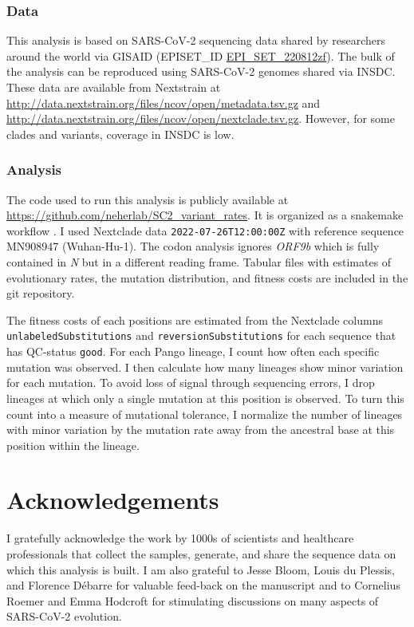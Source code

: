 \documentclass[aps,rmp, twocolumn]{revtex4}
\begin{document}
\subsubsection*{Data}
This analysis is based on SARS-CoV-2 sequencing data shared by researchers around the world via GISAID \citep{shu_gisaid_2017} (EPISET\_ID \href{10.55876/gis8.220812zf}{EPI_SET_220812zf}).
The bulk of the analysis can be reproduced using SARS-CoV-2 genomes shared via INSDC.
These data are available from Nextstrain at \url{http://data.nextstrain.org/files/ncov/open/metadata.tsv.gz} and \url{http://data.nextstrain.org/files/ncov/open/nextclade.tsv.gz}.
However, for some clades and variants, coverage in INSDC is low.

\subsubsection*{Analysis}
The code used to run this analysis is publicly available at \url{https://github.com/neherlab/SC2_variant_rates}.
It is organized as a snakemake workflow \citep{koster_snakemakescalable_2012}.
I used Nextclade data \texttt{2022-07-26T12:00:00Z} with reference sequence MN908947 (Wuhan-Hu-1).
The codon analysis ignores \emph{ORF9b} which is fully contained in \emph{N} but in a different reading frame.
Tabular files with estimates of evolutionary rates, the mutation distribution, and fitness costs are included in the git repository.

The fitness costs of each positions are estimated from the Nextclade columns \texttt{unlabeledSubstitutions} and \texttt{reversionSubstitutions} for each sequence that has QC-status \texttt{good}.
For each Pango lineage, I count how often each specific mutation was observed.
I then calculate how many lineages show minor variation for each mutation.
To avoid loss of signal through sequencing errors, I drop lineages at which only a single mutation at this position is observed.
To turn this count into a measure of mutational tolerance, I normalize the number of lineages with minor variation by the mutation rate away from the ancestral base at this position within the lineage.

\section*{Acknowledgements}
I gratefully acknowledge the work by 1000s of scientists and healthcare professionals that collect the samples, generate, and share the sequence data on which this analysis is built.
I am also grateful to Jesse Bloom, Louis du Plessis, and Florence D\'ebarre for valuable feed-back on the manuscript and to Cornelius Roemer and Emma Hodcroft for stimulating discussions on many aspects of SARS-CoV-2 evolution.



\clearpage
\appendix

\clearpage
\onecolumngrid

% 
\end{document}
